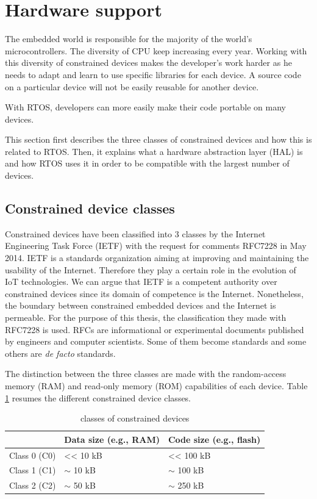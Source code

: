 \section{Hardware support}

The embedded world is responsible for the majority of the world's microcontrollers.
The diversity of CPU keep increasing every year.
Working with this diversity of constrained devices makes the developer's work harder as he needs to adapt and learn to use specific libraries for each device.
A source code on a particular device will not be easily reusable for another device.

With RTOS, developers can more easily make their code portable on many devices.

This section first describes the three classes of constrained devices and how this is related to RTOS.
Then, it explains what a hardware abstraction layer (HAL) is and how RTOS uses it in order to be compatible with the largest number of devices.

\subsection{Constrained device classes}

Constrained devices have been classified into 3 classes by the Internet Engineering Task Force (IETF) with the request for comments RFC7228\cite{RFC7228} in May 2014.
IETF is a standards organization aiming at improving and maintaining the usability of the Internet.
Therefore they play a certain role in the evolution of IoT technologies.
We can argue that IETF is a competent authority over constrained devices since its domain of competence is the Internet.
Nonetheless, the boundary between constrained embedded devices and the Internet is permeable.
For the purpose of this thesis, the classification they made with RFC7228 is used.
RFCs are informational or experimental documents published by engineers and computer scientists.
Some of them become standards and some others are \textit{de facto} standards.

The distinction between the three classes are made with the random-access memory (RAM) and read-only memory (ROM) capabilities of each device.
Table \ref{tab:constrained-devices-classes} resumes the different constrained device classes.

\begin{table}[!h]
  \centering
  \begin{tabular}{|l|l|l|}
  \hline
   & Data size (e.g., RAM) & Code size (e.g., flash) \\ \hline
  Class 0 (C0) & \textless{}\textless{} 10 kB & \textless{}\textless{} 100 kB \\ %
  Class 1 (C1) & $\sim$ 10 kB & $\sim$ 100 kB \\ %
  Class 2 (C2) & $\sim$ 50 kB & $\sim$ 250 kB \\ \hline
  \end{tabular}
  \caption{classes of constrained devices}
  \label{tab:constrained-devices-classes}
\end{table}


